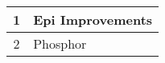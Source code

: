 \documentclass[crop]{standalone}
\begin{document}
    \begin{tabularx}{180pt}{|c|X|}
    \hline
        1 & Epi Improvements \\
    \hline
        2 & Phosphor \\
    \hline
    \end{tabularx}
\end{document}

